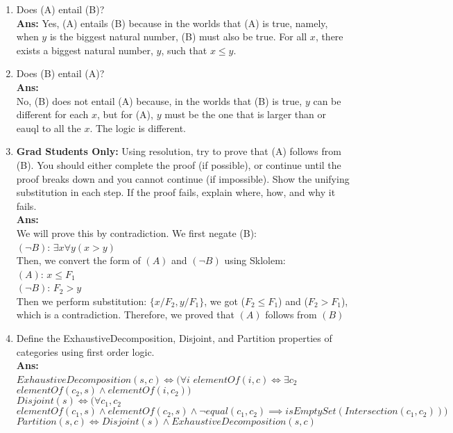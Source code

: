 \documentclass[12pt]{article}
\begin{document}
\begin{enumerate}
\item{Does (A) entail (B)?}\\
\textbf{Ans:} Yes, (A) entails (B) because in the worlds that (A) is true, namely, when $y$ is the biggest natural number, (B) must also be true. For all $x$, there exists a biggest natural number, $y$, such that $x \leq y$.

\item{Does (B) entail (A)?}\\
\textbf{Ans:}\\ No, (B) does not entail (A) because, in the worlds that (B) is true, $y$ can be different for each $x$, but for (A), $y$ must be the one that is larger than or eauql to all the $x$. The logic is different. 

\item{\textbf{Grad Students Only:} Using resolution, try to prove that (A) follows from (B). You should either complete the proof (if possible), or continue until the proof breaks down and you cannot continue (if impossible). Show the unifying substitution in each step. If the proof fails, explain where, how, and why it fails.}\\
\textbf{Ans:}\\
We will prove this by contradiction. We first negate (B):\\
$(\lnot B)$: $\exists x \forall y (x>y)$\\
Then, we convert the form of $(A)$ and $(\lnot B)$ using Sklolem:\\
$(A)$: $x \leq F_1$\\
$(\lnot B)$: $F_2 > y$\\
Then we perform substitution: $\{x / F_2, y/F_1\}$, we got ($F_2 \leq F_1$) and ($F_2 > F_1$), which is a contradiction. Therefore, we proved that $(A)$ follows from $(B)$

\item{Define the ExhaustiveDecomposition, Disjoint, and Partition properties of categories using first order logic.}\\
\textbf{Ans:}\\
\(ExhaustiveDecomposition(s,c) \iff (\forall i\)  $elementOf(i, c) \iff \exists c_2$  $elementOf(c_2, s) \land elementOf(i, c_2))$\\
\(Disjoint(s) \iff (\forall c_1, c_2\) $elementOf(c_1, s) \land elementOf(c_2, s) \land \lnot equal(c_1, c_2) \implies isEmptySet(Intersection(c_1, c_2)))$\\
$Partition(s, c) \iff Disjoint(s) \land ExhaustiveDecomposition(s, c)$


\end{enumerate}
\end{document}
